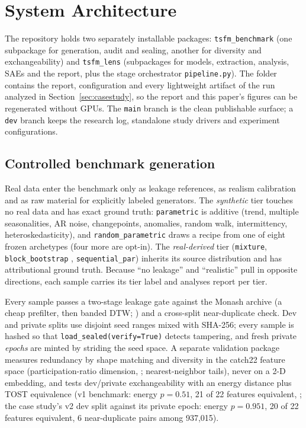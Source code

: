 \section{System Architecture}
\label{sec:architecture}

\label{sec:layout}
The repository holds two separately installable packages: \texttt{tsfm\_benchmark} (one subpackage for
generation, audit and sealing, another for diversity and exchangeability) and \texttt{tsfm\_lens} (subpackages for models, extraction, analysis, SAEs and the report, plus the stage
orchestrator \texttt{pipeline.py}). The folder
 contains the report, configuration and every lightweight artifact of
the run analyzed in Section~\ref{sec:casestudy}, so the report and this paper's figures can be regenerated
without GPUs. The \texttt{main} branch is the clean publishable surface; a \texttt{dev} branch keeps the
research log, standalone study drivers and experiment configurations.

\subsection{Controlled benchmark generation}
\label{sec:benchmark}

Real data enter the benchmark only as leakage references, as realism calibration and as raw material for
explicitly labeled generators. The \emph{synthetic} tier touches no real data and has exact ground truth:
\texttt{parametric} is additive (trend, multiple seasonalities, AR noise, changepoints, anomalies, random
walk, intermittency, heteroskedasticity), and \texttt{random\_parametric} draws a recipe from one of eight
frozen archetypes (four more are opt-in). The \emph{real-derived} tier (\texttt{mixture},
\texttt{block\_bootstrap} \citep{kunsch1989block}, \texttt{sequential\_par}) inherits its source distribution
and has attributional ground truth. Because ``no leakage'' and ``realistic'' pull in opposite directions,
each sample carries its tier label and analyses report per tier.

Every sample passes a two-stage leakage gate against the Monash archive \citep{godahewa2021monash} (a cheap
prefilter, then banded DTW; \citealp{sakoe1978dtw}) and a cross-split near-duplicate check. Dev and private
splits use disjoint seed ranges mixed with SHA-256; every sample is hashed so that
\texttt{load\_sealed(verify=True)} detects tampering, and fresh private \emph{epochs} are minted by striding
the seed space. A separate validation package measures redundancy by shape matching and diversity in the
catch22 feature space \citep{lubba2019catch22} (participation-ratio dimension, \citealp{gao2017pr};
nearest-neighbor tails), never on a 2-D embedding, and tests dev/private exchangeability with an energy
distance \citep{szekely2013energy} plus TOST equivalence \citep{schuirmann1987tost} (v1 benchmark: energy
$p=0.51$, 21 of 22 features equivalent, ; the case study's v2 dev split against its private epoch: energy
$p=0.951$, 20 of 22 features equivalent, 6 near-duplicate pairs among 937{,}015).

